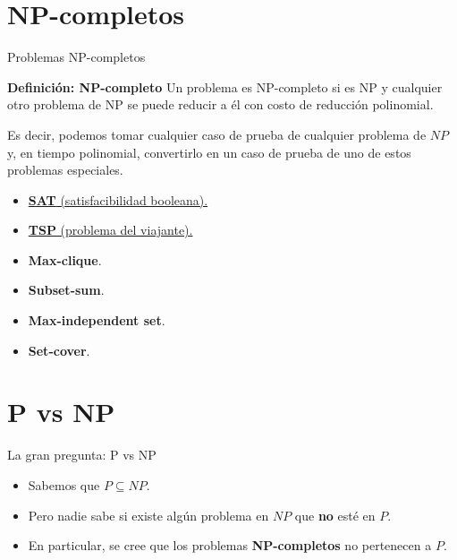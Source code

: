 \documentclass[aspectratio=169]{beamer}
\begin{document}
\section{NP-completos}

\begin{frame}{Problemas NP-completos}
    \begin{block}{\textbf{Definición: NP-completo}}
      Un problema es NP-completo si es NP y cualquier otro problema de NP se puede reducir a él con costo de reducción polinomial.
      
      Es decir, podemos tomar cualquier caso de prueba de cualquier problema de $NP$ y, en tiempo polinomial, convertirlo en un caso de prueba de uno de estos problemas especiales.
    \end{block}

    \begin{itemize}
        \item \href{https://en.wikipedia.org/wiki/Boolean_satisfiability_problem}{\textbf{SAT} (satisfacibilidad booleana).}
        \item \href{https://en.wikipedia.org/wiki/Travelling_salesman_problem}{\textbf{TSP} (problema del viajante).}
        \item \textbf{Max-clique}.
        \item \textbf{Subset-sum}.
        \item \textbf{Max-independent set}.
        \item \textbf{Set-cover}.
  \end{itemize}
\end{frame}

\section{P vs NP}

\begin{frame}{La gran pregunta: P vs NP}
  \begin{itemize}
    \item Sabemos que $P \subseteq NP$.
    \item Pero nadie sabe si existe algún problema en $NP$ que \textbf{no} esté en $P$.
    \item En particular, se cree que los problemas \textbf{NP-completos} no pertenecen a $P$.
  \end{itemize}
\end{frame}
\end{document}
